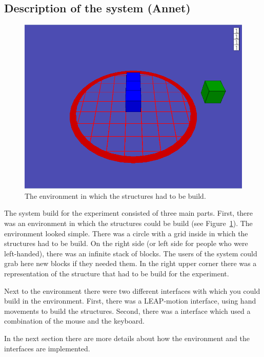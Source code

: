 \subsection{Description of the system (Annet)}
\begin{figure}
\includegraphics[width=\textwidth]{imgs/environment}
\caption{The environment in which the structures had to be build.}
\label{fig:environment}
\end{figure}

The system build for the experiment consisted of three main parts. First, there was an environment in which the structures could be build (see Figure~\ref{fig:environment}). The environment looked simple. There was a circle with a grid inside in which the structures had to be build. On the right side (or left side for people who were left-handed), there was an infinite stack of blocks. The users of the system could grab here new blocks if they needed them. In the right upper corner there was a representation of the structure that had to be build for the experiment.

Next to the environment there were two different interfaces with which you could build in the environment. First, there was a LEAP-motion interface, using hand movements to build the structures. Second, there was a interface which used a combination of the mouse and the keyboard.

In the next section there are more details about how the environment and the interfaces are implemented.